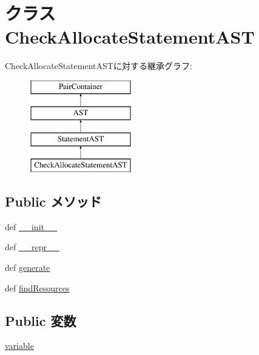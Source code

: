 \hypertarget{classslicc_1_1ast_1_1CheckAllocateStatementAST_1_1CheckAllocateStatementAST}{
\section{クラス CheckAllocateStatementAST}
\label{classslicc_1_1ast_1_1CheckAllocateStatementAST_1_1CheckAllocateStatementAST}
}
CheckAllocateStatementASTに対する継承グラフ:\begin{figure}[H]
\begin{center}
\leavevmode
\includegraphics[height=4cm]{classslicc_1_1ast_1_1CheckAllocateStatementAST_1_1CheckAllocateStatementAST}
\end{center}
\end{figure}
\subsection*{Public メソッド}
\begin{DoxyCompactItemize}
\item 
def \hyperlink{classslicc_1_1ast_1_1CheckAllocateStatementAST_1_1CheckAllocateStatementAST_ac775ee34451fdfa742b318538164070e}{\_\-\_\-init\_\-\_\-}
\item 
def \hyperlink{classslicc_1_1ast_1_1CheckAllocateStatementAST_1_1CheckAllocateStatementAST_ad8b9328939df072e4740cd9a63189744}{\_\-\_\-repr\_\-\_\-}
\item 
def \hyperlink{classslicc_1_1ast_1_1CheckAllocateStatementAST_1_1CheckAllocateStatementAST_a4555d1cee0dccf3942ea35fe86de2e8e}{generate}
\item 
def \hyperlink{classslicc_1_1ast_1_1CheckAllocateStatementAST_1_1CheckAllocateStatementAST_abd195c795639b490ba2de4c1246105f1}{findResources}
\end{DoxyCompactItemize}
\subsection*{Public 変数}
\begin{DoxyCompactItemize}
\item 
\hyperlink{classslicc_1_1ast_1_1CheckAllocateStatementAST_1_1CheckAllocateStatementAST_a9cd756653e5b34f63d5cf5c342143cb5}{variable}
\end{DoxyCompactItemize}


